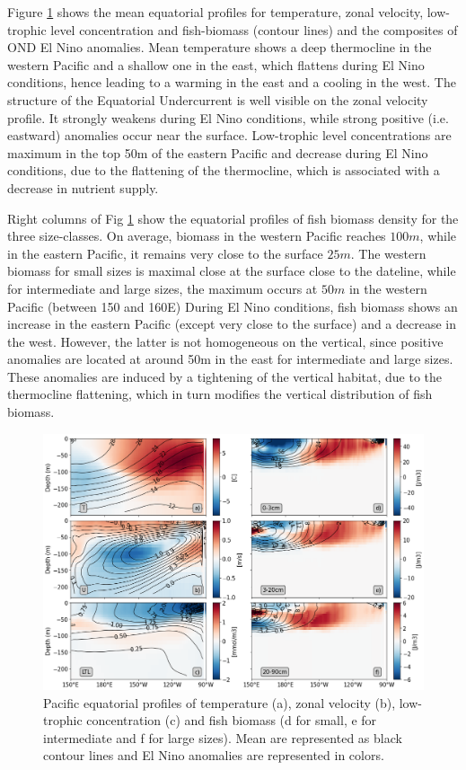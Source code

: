 Figure \ref{fig:profiles} shows the mean equatorial profiles for temperature, zonal velocity, low-trophic level concentration and fish-biomass (contour lines) and the composites of OND El Nino anomalies. Mean temperature shows a deep thermocline in the western Pacific and a shallow one in the east, which flattens during El Nino conditions, hence leading to a warming in the east and a cooling in the west. The structure of the Equatorial Undercurrent is well visible on the zonal velocity profile. It strongly weakens during El Nino conditions, while strong positive (i.e. eastward) anomalies occur near the surface. Low-trophic level concentrations are maximum in the top 50m of the eastern Pacific and decrease during El Nino conditions, due to the flattening of the thermocline, which is associated with a decrease in nutrient supply.

Right columns of Fig \ref{fig:profiles} show the equatorial profiles of fish biomass density for the three size-classes. On average, biomass in the western Pacific reaches $100m$, while in the eastern Pacific, it remains very close to the surface $25m$. The western biomass for small sizes is maximal close at the surface close to the dateline, while for intermediate and large sizes, the maximum occurs at $50m$ in the western Pacific (between 150 and 160\degree{}E)
During El Nino conditions, fish biomass shows an increase in the eastern Pacific (except very close to the surface) and a decrease in the west. However, the latter is not homogeneous on the vertical, since positive anomalies are located at around 50m in the east for intermediate and large sizes. These anomalies are induced by a tightening of the vertical habitat, due to the thermocline flattening, which in turn modifies the vertical distribution of fish biomass.

\begin{figure}[h!tp]
	\centering
	\includegraphics[scale=0.4]{figs/forage_mean_ond97.png}	
	\caption{Pacific equatorial profiles of temperature (a), zonal velocity (b), low-trophic concentration (c) and fish biomass (d for small, e for intermediate and f for large sizes). Mean are represented as black contour lines and El Nino anomalies are represented in colors.}	
	\label{fig:profiles}
\end{figure}

